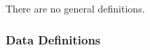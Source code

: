 \documentclass[12pt]{article}
\newcommand{\colAwidth}{0.13\textwidth}
\newcommand{\colBwidth}{0.82\textwidth}
\newcounter{defnum} %
\newcommand{\ddref}[1]{DD\ref{#1}}
\newcommand{\aref}[1]{A\ref{#1}}
\begin{document}

There are no general definitions.

%
%

\subsubsection{Data Definitions}\label{sec_datadef}
\end{document}
